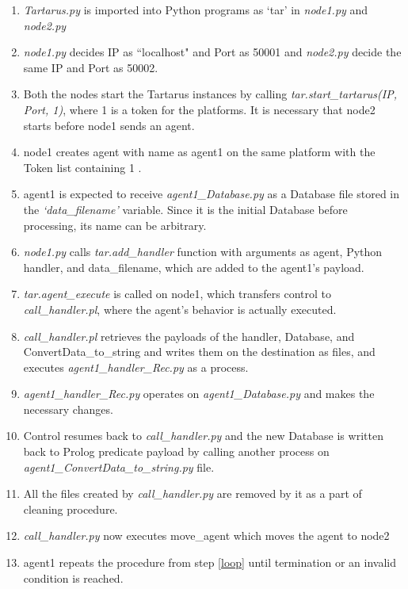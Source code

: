 \begin{enumerate}
    \item \textit{Tartarus.py} is imported into Python programs as `tar' in \textit{node1.py} and \textit{node2.py} 
    \item \textit{node1.py} decides IP as ``localhost" and Port as 50001 and \textit{node2.py} decide the same IP and Port as 50002.
    \item Both the nodes start the Tartarus instances by calling \textit{tar.start\_tartarus(IP, Port, 1)}, where 1 is a token for the platforms. It is necessary that node2 starts before node1 sends an agent.
\item node1 creates agent with name as agent1 on the same platform with the Token list containing 1 .
\item agent1 is expected to receive \textit{agent1\_Database.py} as a Database file stored in the \textit{`data\_filename'} variable. Since it is the initial Database before processing, its name can be arbitrary.
\item \textit{node1.py} calls \textit{tar.add\_handler} function with arguments as agent, Python handler, and data\_filename, which are added to the agent1's payload.
\item \textit{tar.agent\_execute} is called on node1, which transfers control to \textit{call\_handler.pl}, where the agent's behavior is actually executed.
\item \textit{call\_handler.pl} retrieves the payloads of the handler, Database, and ConvertData\_to\_string and writes them on the destination as files, and executes \textit{agent1\_handler\_Rec.py} as a process. \label{loop}
\item \textit{agent1\_handler\_Rec.py} operates on \textit{agent1\_Database.py} and makes the necessary changes.
\item Control resumes back to \textit{call\_handler.py} and the new Database is written back to Prolog predicate payload by calling another process on \textit{agent1\_ConvertData\_to\_string.py} file. 
\item All the files created by \textit{call\_handler.py} are removed by it as a part of cleaning procedure.
\item \textit{call\_handler.py} now executes move\_agent which moves the agent to node2
\item agent1 repeats the procedure from step \ref{loop} until termination or an invalid condition is reached.
\end{enumerate}